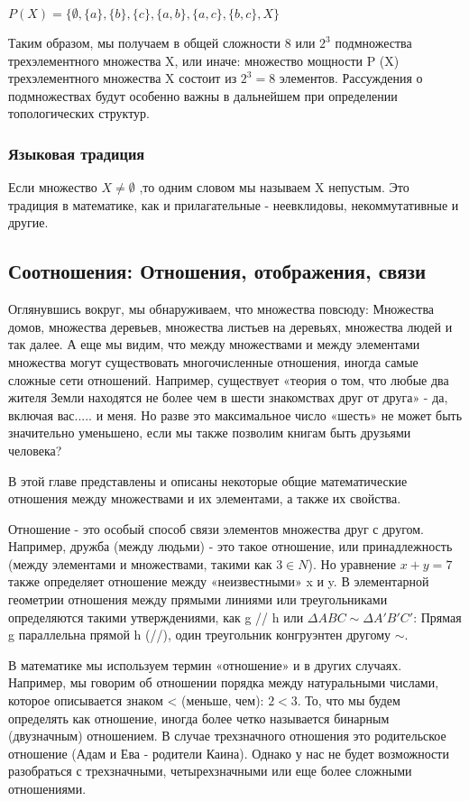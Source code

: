 \vspace{0.5cm}
\(P(X)=\{\emptyset, \{a\}, \{b\},\{c\},\{a,b\},\{a,c\},\{b,c\}, X\}\)

\vspace{0.5cm}

Таким образом, мы получаем в общей сложности 8 или \(2^3\) подмножества трехэлементного множества X, или иначе: множество мощности P (X) трехэлементного множества X состоит из \(2^3 = 8\) элементов. Рассуждения о подмножествах будут особенно важны в дальнейшем при определении топологических структур.

\subsubsection{Языковая традиция}
Если множество \(X \neq \emptyset\) ,то одним словом мы называем X непустым. Это традиция в математике, как и прилагательные - неевклидовы, некоммутативные и другие.

\subsection{Соотношения: Отношения, отображения, связи}
Оглянувшись вокруг, мы обнаруживаем, что  множества повсюду: Множества домов, множества деревьев, множества листьев на деревьях, множества людей и так далее. А еще мы видим, что между множествами и между элементами множества могут существовать многочисленные отношения, иногда самые сложные сети отношений. Например, существует «теория о том, что любые два жителя Земли находятся не более чем в шести знакомствах друг от друга» - да, включая вас..... и меня. Но разве это максимальное число «шесть» не может быть значительно уменьшено, если мы также позволим книгам быть друзьями человека?

В этой главе представлены и описаны некоторые общие математические отношения между множествами и их элементами, а также их свойства.

Отношение - это особый способ связи элементов множества друг с другом. Например, дружба (между людьми) - это такое отношение, или принадлежность (между элементами и множествами, такими как \(3 \in N\)).
Но уравнение \(x + y =7\) также определяет отношение между «неизвестными» x и y.
В элементарной геометрии отношения между прямыми линиями или треугольниками определяются такими утверждениями, как g // h или \(\Delta ABC \sim \Delta A'B'C'\): Прямая g параллельна прямой h (//), один треугольник конгруэнтен другому \(\sim\).

В математике мы используем термин «отношение» и в других случаях. Например, мы говорим об отношении порядка между натуральными числами, которое описывается знаком < (меньше, чем): \(2 < 3\).
То, что мы будем определять как отношение, иногда более четко называется бинарным (двузначным) отношением. В случае трехзначного отношения это родительское отношение (Адам и Ева - родители Каина).
Однако у нас не будет возможности разобраться с трехзначными, четырехзначными или еще более сложными отношениями.

